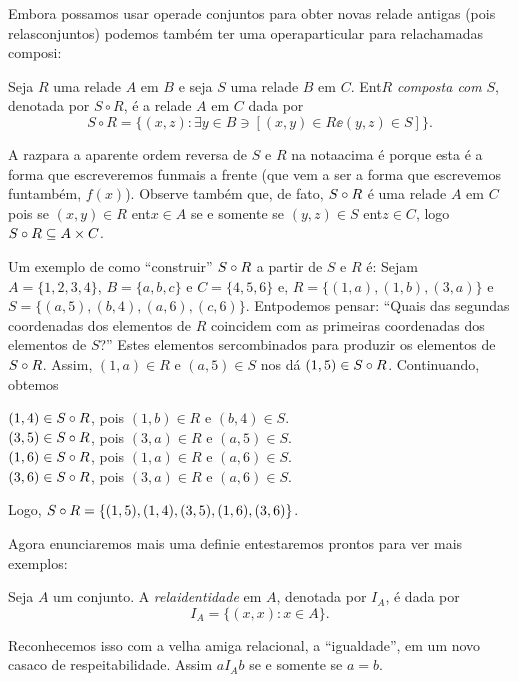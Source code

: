 Embora possamos usar opera\coes de conjuntos para obter novas rela\coes de antigas (pois rela\coes s\ao conjuntos) podemos tamb\'em ter uma opera\cao particular para rela\coes chamadas composi\cois:
\begin{definb}
Seja $R$ uma rela\cao de $A$ em $B$ e seja $S$ uma rela\cao de $B$ em $C$. Ent\ao $R$ {\it composta com} $S$, denotada por $S\circ R$, \'e a rela\cao de $A$ em $C$ dada por 
\[
S\circ R=\{(x,z): \exists y\in B\ni [(x,y)\in R\ee (y,z)\in S]\}.
\]
\end{definb}

A raz\ao para a aparente ordem reversa de $S$ e $R$ na nota\cao acima \'e porque esta \'e a forma que escreveremos fun\coes mais a frente (que vem a ser a forma que escrevemos fun\coes tamb\'em, $f(x)$). Observe tamb\'em que, de fato, $S\circ R$ \'e uma rela\cao de $A$ em $C$ pois se $(x,y)\in R$ ent\ao $x\in A$ se e somente se $(y,z)\in S$ ent\ao $z\in C$, logo $S\circ R\subseteq A\times C$.

Um exemplo de como ``construir'' $S\circ R$ a partir de $S$ e $R$ \'e: Sejam $A=\{1,2,3,4\}$, $B=\{a,b,c\}$ e $C=\{4,5,6\}$ e, $R=\{(1,a),(1,b),(3,a)\}$ e $S=\{(a,5),(b,4),(a,6),(c,6)\}$. Ent\ao podemos pensar: ``Quais das segundas coordenadas dos elementos de $R$ coincidem com as primeiras coordenadas dos elementos de $S$?'' Estes elementos ser\ao combinados para produzir os elementos de $S\circ R$. Assim, $(1,a)\in R$ e $(a,5)\in S$ nos d\'a $(1,5)\in S\circ R$. Continuando, obtemos
\begin{center}
$(1,4)\in S\circ R$, pois $(1,b)\in R$ e $(b,4)\in S$.\\
$(3,5)\in S\circ R$, pois $(3,a)\in R$ e $(a,5)\in S$.\\
$(1,6)\in S\circ R$, pois $(1,a)\in R$ e $(a,6)\in S$.\\
$(3,6)\in S\circ R$, pois $(3,a)\in R$ e $(a,6)\in S$.
\end{center}
Logo, $S\circ R=\{(1,5),(1,4),(3,5),(1,6),(3,6)\}$.

Agora enunciaremos mais uma defini\cao e ent\ao estaremos prontos para ver mais exemplos:
\begin{definb}
Seja $A$ um conjunto. A {\it rela\cao identidade} em $A$, denotada por $I_A$, \'e dada por
\[
I_A=\{(x,x):x\in A\}.
\]
\end{definb}
Reconhecemos isso com a velha amiga relacional, a ``igualdade'', em um novo casaco de respeitabilidade. Assim $aI_Ab$ se e somente se $a=b$.

